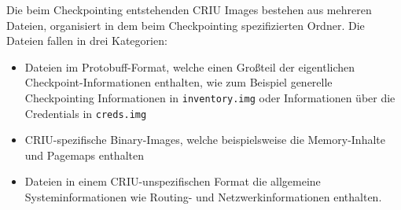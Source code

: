 \documentclass[a4paper]{article}
\begin{document}
Die beim Checkpointing entstehenden CRIU Images bestehen aus mehreren Dateien, organisiert in dem beim Checkpointing spezifizierten Ordner. Die Dateien fallen in drei Kategorien: \begin{itemize}
    \item Dateien im Protobuff-Format, welche einen Großteil der eigentlichen Checkpoint-Informationen enthalten, wie zum Beispiel generelle Checkpointing Informationen in \texttt{inventory.img} oder Informationen über die Credentials in \texttt{creds.img}
    \item CRIU-spezifische Binary-Images, welche beispielsweise die Memory-Inhalte und Pagemaps enthalten
    \item Dateien in einem CRIU-unspezifischen Format die allgemeine Systeminformationen wie Routing- und Netzwerkinformationen enthalten.
\end{itemize}
\end{document}
